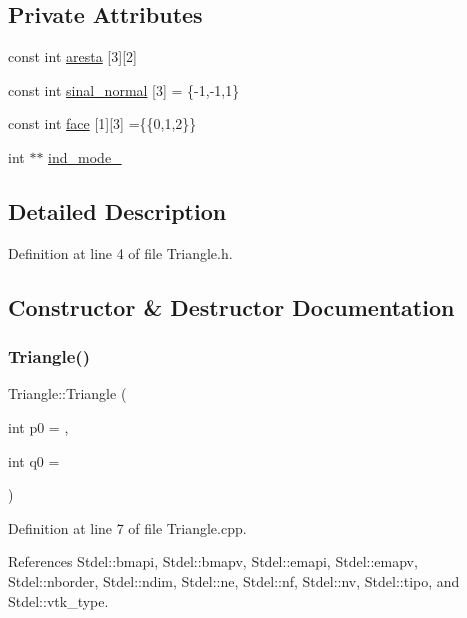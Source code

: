 \subsection*{Private Attributes}
\begin{DoxyCompactItemize}
\item 
const int \hyperlink{classTriangle_a4f19e62f5f4ca0e2a8f3747401eb2a44}{aresta} \mbox{[}3\mbox{]}\mbox{[}2\mbox{]}
\item 
const int \hyperlink{classTriangle_a8cd0ca9207ef546b87d71b3d2d1d69c9}{sinal\+\_\+normal} \mbox{[}3\mbox{]} = \{-\/1,-\/1,1\}
\item 
const int \hyperlink{classTriangle_a693659752f394140a7ad5010208b3ab0}{face} \mbox{[}1\mbox{]}\mbox{[}3\mbox{]} =\{\{0,1,2\}\}
\item 
int $\ast$$\ast$ \hyperlink{classTriangle_acafeae167367cb8c0def01e37ba0a908}{ind\+\_\+mode\+\_\+}
\end{DoxyCompactItemize}


\subsection{Detailed Description}


Definition at line 4 of file Triangle.\+h.



\subsection{Constructor \& Destructor Documentation}
\mbox{\label{classTriangle_a268f528f307fa58b426f5e08b4847adb}} 
\subsubsection{\texorpdfstring{Triangle()}{Triangle()}}
{\footnotesize\ttfamily Triangle\+::\+Triangle (\begin{DoxyParamCaption}\item[{int}]{p0 = {},  }\item[{int}]{q0 = {} }\end{DoxyParamCaption})}



Definition at line 7 of file Triangle.\+cpp.



References Stdel\+::bmapi, Stdel\+::bmapv, Stdel\+::emapi, Stdel\+::emapv, Stdel\+::nborder, Stdel\+::ndim, Stdel\+::ne, Stdel\+::nf, Stdel\+::nv, Stdel\+::tipo, and Stdel\+::vtk\+\_\+type.

